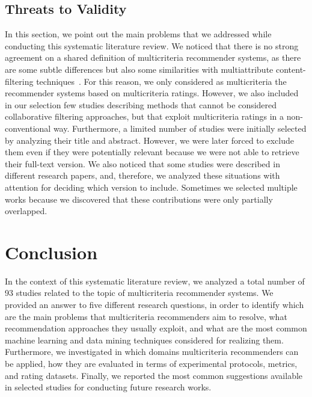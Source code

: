 \subsection{Threats to Validity}

In this section, we point out the main problems that we addressed while conducting this systematic literature review. We noticed that there is no strong agreement on a shared definition of multicriteria recommender systems, as there are some subtle differences but also some similarities with multiattribute content-filtering techniques~\cite{Adomavicius2015}. For this reason, we only considered as multicriteria the recommender systems based on multicriteria ratings. However, we also included in our selection few studies describing methods that cannot be considered collaborative filtering approaches, but that exploit multicriteria ratings in a non-conventional way. Furthermore, a limited number of studies were initially selected by analyzing their title and abstract. However, we were later forced to exclude them even if they were potentially relevant because we were not able to retrieve their full-text version. We also noticed that some studies were described in different research papers, and, therefore, we analyzed these situations with attention for deciding which version to include. Sometimes we selected multiple works because we discovered that these contributions were only partially overlapped.%

\section{Conclusion}
\label{mcr:sec:conclusions}

In the context of this systematic literature review, we analyzed a total number of 93 studies related to the topic of multicriteria recommender systems. We provided an answer to five different research questions, in order to identify which are the main problems that multicriteria recommenders aim to resolve, what recommendation approaches they usually exploit, and what are the most common machine learning and data mining techniques considered for realizing them. Furthermore, we investigated in which domains multicriteria recommenders can be applied, how they are evaluated in terms of experimental protocols, metrics, and rating datasets. Finally, we reported the most common suggestions available in selected studies for conducting future research works.

